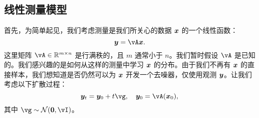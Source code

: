 \documentclass[../../book-main.tex]{subfiles}
\begin{document}


\subsection{线性测量模型}
首先，为简单起见，我们考虑测量是我们所关心的数据 $\bm{x}$ 的一个线性函数：
\begin{equation}
    \y = \vA\x.
\end{equation}
这里矩阵 $\vA \in \mathbb{R}^{m\times n}$ 是行满秩的，且 $m$ 通常小于 $n$。我们暂时假设 $\vA$ 是已知的。我们感兴趣的是如何从这样的测量中学习 $\bm{x}$ 的分布。由于我们不再有 $\bm{x}$ 的直接样本，我们想知道是否仍然可以为 $\bm{x}$ 开发一个去噪器，仅使用观测 $\bm{y}$。让我们考虑以下扩散过程：
\begin{equation}
    \y_t = \y_0 + t \vg, \quad \y_0 = \vA(\x_0), 
\end{equation}
其中 $\vg \sim \mathcal{N}(\boldsymbol{0}, \vI)$。
\end{document}
